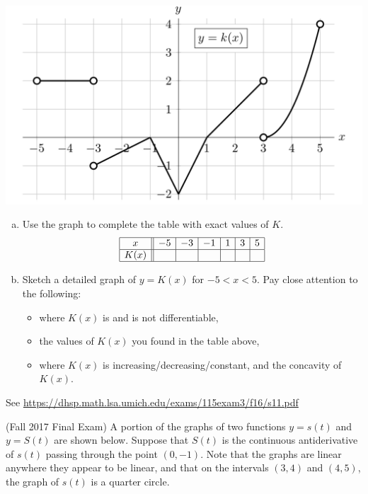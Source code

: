 \documentclass[11pt]{exam}
\begin{document}
\begin{questions}
	\vspace{-0.5em}
        \begin{center}
          \includegraphics[scale=0.45]{Figures/graphk}
        \end{center}
	\vspace{-2em}
	\begin{enumerate}[(a)]
		\item Use the graph to complete the table with exact values of $K$.
		$$\begin{array}{|c||c|c|c|c|c|c|c|}
	\hline
	x & -5 & -3 & -1 & 1 & 3 & 5 \\
	\hline
	K(x) & & & & & & \\
	\hline
	\end{array}$$
		\item Sketch a detailed graph of $y = K(x)$ for $-5 < x < 5$. Pay close attention to the following:
\begin{itemize}
	\item where $K(x)$ is and is not differentiable,
	\item the values of $K(x)$ you found in the table above,
	\item where $K(x)$ is increasing/decreasing/constant, and the concavity of $K(x)$.
\end{itemize}
	\end{enumerate}
        \begin{solution}
          See \href{https://dhsp.math.lsa.umich.edu/exams/115exam3/f16/s11.pdf}{https://dhsp.math.lsa.umich.edu/exams/115exam3/f16/s11.pdf}
        \end{solution}
        \pagebreak
\question (Fall 2017 Final Exam) 
	A portion of the graphs of two functions $y = s(t)$ and $y = S(t)$ are shown below. Suppose that $S(t)$ is the continuous antiderivative of $s(t)$ passing through the point $(0,-1)$. Note that the graphs are linear anywhere they appear to be linear, and that on the intervals $(3, 4)$ and $(4, 5)$, the graph of $s(t)$ is a quarter circle.\

\end{questions}
\end{document}
